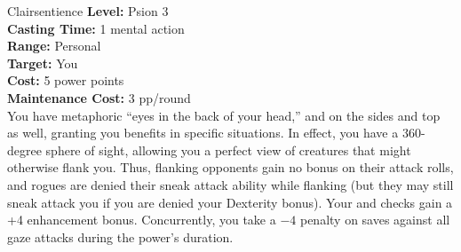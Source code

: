 {Clairsentience}
{
	\textbf{Level:}
	Psion 3\\
	\textbf{Casting Time:}
	1 mental action\\
	\textbf{Range:}
	Personal\\
	\textbf{Target:}
	You\\
	\textbf{Cost:}
	5 power points\\
	\textbf{Maintenance Cost:}
	3 pp/round\\
}
{
	You have metaphoric ``eyes in the back of your head,'' and on the sides and top as well, granting you benefits in specific situations. In effect, you have a 360-degree sphere of sight, allowing you a perfect view of creatures that might otherwise flank you. Thus, flanking opponents gain no bonus on their attack rolls, and rogues are denied their sneak attack ability while flanking (but they may still sneak attack you if you are denied your Dexterity bonus). Your  and  checks gain a +4 enhancement bonus. Concurrently, you take a $-4$ penalty on saves against all gaze attacks during the power's duration. 
}